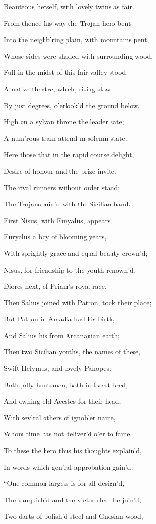 Beauteous herself, with lovely twins as fair.

From thence his way the Trojan hero bent

Into the neighb’ring plain, with mountains pent,

Whose sides were shaded with surrounding wood.

Full in the midst of this fair valley stood

A native theatre, which, rising slow

By just degrees, o’erlook’d the ground below.

High on a sylvan throne the leader sate;

A num’rous train attend in solemn state.

Here those that in the rapid course delight,

Desire of honour and the prize invite.

The rival runners without order stand;

The Trojans mix’d with the Sicilian band.

First Nisus, with Euryalus, appears;

Euryalus a boy of blooming years,

With sprightly grace and equal beauty crown’d;

Nisus, for friendship to the youth renown’d.

Diores next, of Priam’s royal race,

Then Salius joined with Patron, took their place;

But Patron in Arcadia had his birth,

And Salius his from Arcananian earth;

Then two Sicilian youths, the names of these,

Swift Helymus, and lovely Panopes:

Both jolly huntsmen, both in forest bred,

And owning old Acestes for their head;

With sev’ral others of ignobler name,

Whom time has not deliver’d o’er to fame.

To these the hero thus his thoughts explain’d,

In words which gen’ral approbation gain’d:

“One common largess is for all design’d,

The vanquish’d and the victor shall be join’d,

Two darts of polish’d steel and Gnosian wood,

